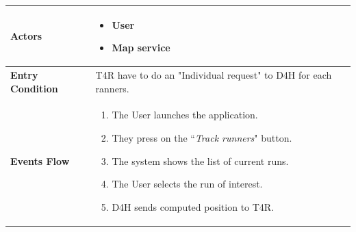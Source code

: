            \begin{table}[H]
            	\centering
                
                \begin{tabular}{|p{3cm}|p{8.2cm}|}
                    \hline
                    \textbf{Actors} & \begin{itemize}
                                            \item User
                                            \item Map service
                                        \end{itemize} \\
                     \hline
                    \textbf{Entry Condition} & T4R have to do an "Individual request" to D4H for each ranners. \\
                     \hline
                    \textbf{Events Flow} & \begin{enumerate}
                                                \item The User launches the application.
                                                \item They press on the ``\emph{Track runners}" button.
                                                \item The system shows the list of current runs.
                                                \item The User selects the run of interest.
                                                \item D4H sends computed position to T4R.
                                                

\end{enumerate}
\end{tabular}
\end{table}
